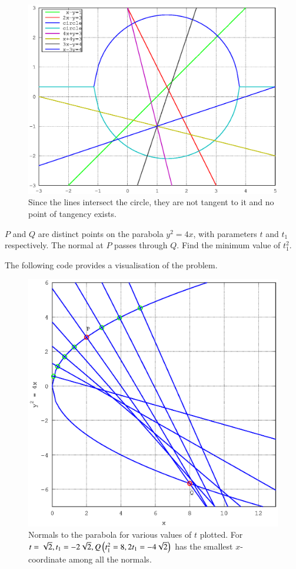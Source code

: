 \documentclass[journal,12pt,twocolumn]{IEEEtran}
\begin{document}
\begin{figure}[h]
\centering
\includegraphics[width=\columnwidth]{./figs/ee16b1022}
\caption{ Since the lines intersect the circle, they are not tangent to it and no point of tangency exists. }
\label{fig_22}	
\end{figure}
%
\begin{problem}
$P$ and $Q$ are distinct points on the parabola $y^2 = 4x$, with parameters $t$ and $t_1$ respectively. The normal at $P$ passes through $Q$.  Find the minimum value of $t_1^2$.
\end{problem}
\solution

The following code provides a visualisation of the problem.

%
\begin{figure}[h]
\centering
\includegraphics[width=\columnwidth]{./figs/ee16b1023}
\caption{ Normals to the parabola for various values of $t$ plotted.  For $t = \sqrt{2}, t_1 = -2\sqrt{2}, Q\left(t_1^2 = 8, 2t_1 = -4\sqrt{2}\right)$ has the smallest $x$-coordinate   among all the normals.}
\label{fig_23}	
\end{figure}
\end{document}
